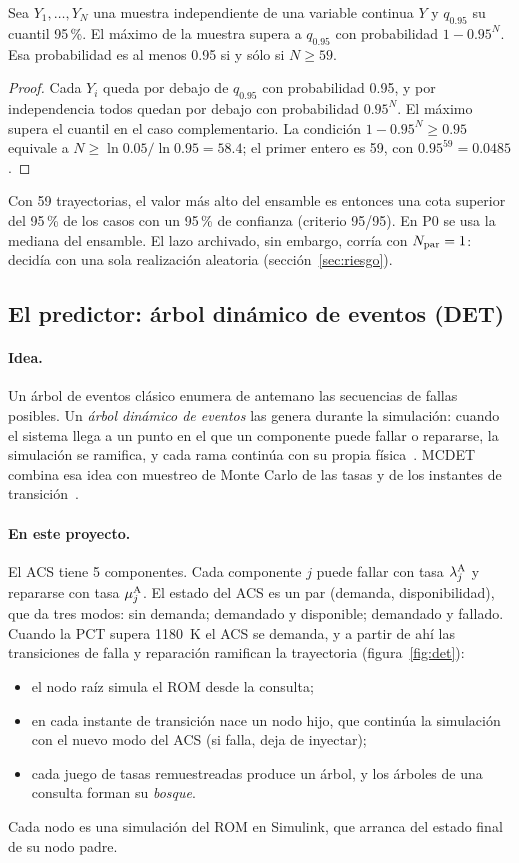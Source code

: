 \begin{proposicion}\label{prop:wilks}
Sea $Y_1,\dots,Y_N$ una muestra independiente de una variable continua $Y$ y $q_{0.95}$ su
cuantil 95\,\%. El máximo de la muestra supera a $q_{0.95}$ con probabilidad
$1-0.95^N$. Esa probabilidad es al menos 0.95 si y sólo si $N\ge59$.
\end{proposicion}
\begin{proof}
Cada $Y_i$ queda por debajo de $q_{0.95}$ con probabilidad 0.95, y por independencia todos
quedan por debajo con probabilidad $0.95^N$. El máximo supera el cuantil en el caso
complementario. La condición $1-0.95^N\ge0.95$ equivale a $N\ge\ln0.05/\ln0.95=58.4$; el
primer entero es 59, con $0.95^{59}=0.0485$.
\end{proof}
\noindent Con 59 trayectorias, el valor más alto del ensamble es entonces una cota superior del
95\,\% de los casos con un 95\,\% de confianza (criterio 95/95). En P0 se usa la mediana del
ensamble. El lazo archivado, sin embargo, corría con $N_{\rm par}=1$: decidía con una sola
realización aleatoria (sección~\ref{sec:riesgo}).

\subsection{El predictor: árbol dinámico de eventos (DET)}
\paragraph{Idea.} Un árbol de eventos clásico enumera de antemano las secuencias de fallas
posibles. Un \emph{árbol dinámico de eventos} las genera durante la simulación: cuando el
sistema llega a un punto en el que un componente puede fallar o repararse, la simulación se
ramifica, y cada rama continúa con su propia física~\cite{hakobyan2008}. MCDET combina esa idea
con muestreo de Monte Carlo de las tasas y de los instantes de transición~\cite{kloos2006}.

\paragraph{En este proyecto.} El ACS tiene 5 componentes. Cada componente $j$ puede fallar con
tasa $\lambda^{\rm A}_j$ y repararse con tasa $\mu^{\rm A}_j$. El estado del ACS es un par
(demanda, disponibilidad), que da tres modos: sin demanda; demandado y disponible; demandado y
fallado. Cuando la PCT supera 1180~K el ACS se demanda, y a partir de ahí las transiciones de
falla y reparación ramifican la trayectoria (figura~\ref{fig:det}):
\begin{itemize}
  \item el nodo raíz simula el ROM desde la consulta;
  \item en cada instante de transición nace un nodo hijo, que continúa la simulación con el
        nuevo modo del ACS (si falla, deja de inyectar);
  \item cada juego de tasas remuestreadas produce un árbol, y los árboles de una consulta
        forman su \emph{bosque}.
\end{itemize}
Cada nodo es una simulación del ROM en Simulink, que arranca del estado final de su nodo padre.

